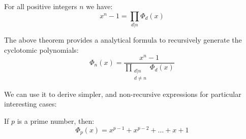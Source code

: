 \begin{theorem} \label{teoremaco}For all positive integers $n$ we have:
$$\displaystyle x^n-1=\prod_{d|n}\Phi_d(x)$$
\end{theorem}

The above theorem provides a analytical formula to recursively generate the cyclotomic polynomials:
$$\displaystyle\Phi_n(x)=\dfrac{x^n-1}{\displaystyle\prod_{\substack{d|n\\d\neq n}}\Phi_d(x)}$$

We can use it to derive simpler, and non-recursive expressions for particular interesting cases:

\begin{corollary}
If $p$ is a prime number, then:
$$\Phi_p(x)=x^{p-1}+x^{p-2}+\ldots+x+1$$
\end{corollary}

